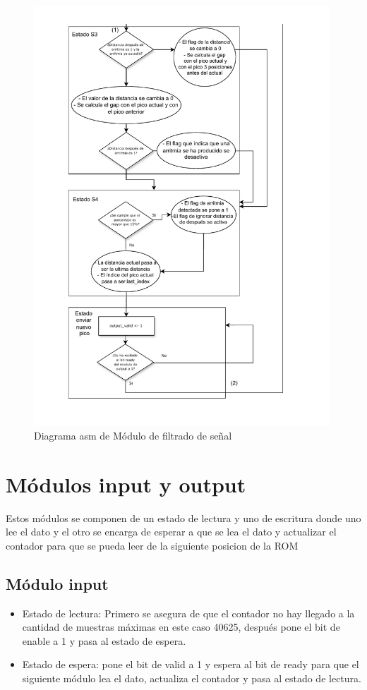\begin{figure}[h!]
    \centering
    \includegraphics[width=0.99\textwidth]{./Images/img_implementacion_hw/Diagramaasmarritmias2.pdf}
    \caption{Diagrama asm de Módulo de filtrado de señal}
    \label{fig:Diagramaasmarritmias2}
\end{figure} 
\FloatBarrier
\section {Módulos input y output}
Estos módulos se componen de un estado de lectura y uno de escritura donde uno lee el dato y el otro se encarga de esperar a que se lea el dato y actualizar 
el contador para que se pueda leer de la siguiente posicion de la ROM

\subsection{Módulo input}
\begin{itemize}
    \item Estado de lectura: Primero se asegura de que el contador no hay llegado a la cantidad de muestras máximas en este caso 40625, después pone el bit de enable a 1 
    y pasa al estado de espera.
    \item Estado de espera: pone el bit de valid a 1 y espera al bit de ready para que el siguiente módulo lea el dato, actualiza el contador y pasa al estado de lectura.
\end{itemize}

